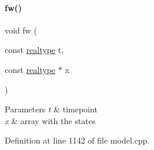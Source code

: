 \paragraph{\texorpdfstring{fw()}{fw()}\hspace{0.1cm}{\footnotesize\ttfamily [1/2]}}
{\footnotesize\ttfamily void fw (\begin{DoxyParamCaption}\item[{const \mbox{\hyperlink{namespaceamici_a1bdce28051d6a53868f7ccbf5f2c14a3}{realtype}}}]{t,  }\item[{const \mbox{\hyperlink{namespaceamici_a1bdce28051d6a53868f7ccbf5f2c14a3}{realtype}} $\ast$}]{x }\end{DoxyParamCaption})}


\begin{DoxyParams}{Parameters}
{\em t} & timepoint \\
\hline
{\em x} & array with the states \\
\hline
\end{DoxyParams}


Definition at line 1142 of file model.\+cpp.


